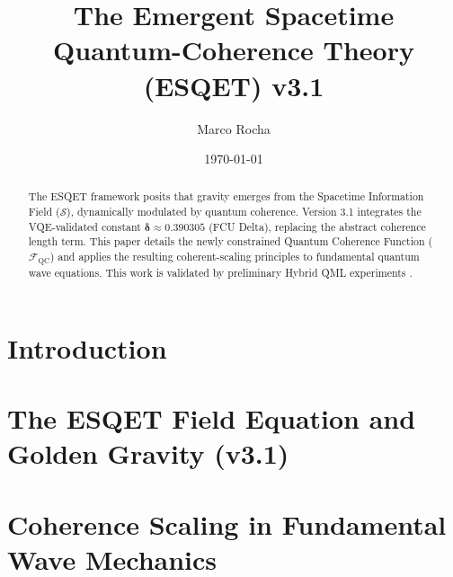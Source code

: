 \documentclass[12pt, a4paper]{report}
\newcommand{\SField}{\mathcal{S}}
\newcommand{\FQC}{\mathcal{F}_{\text{QC}}}
\newcommand{\FCUDelta}{\mathbf{\delta}}
\newcommand{\deltaVal}{0.390305}
\begin{document}
\title{The Emergent Spacetime Quantum-Coherence Theory (ESQET) v3.1}
\author{Marco Rocha}
\date{\today}
\maketitle

\begin{abstract}
The ESQET framework posits that gravity emerges from the Spacetime Information Field ($\SField$), dynamically modulated by quantum coherence. Version 3.1 integrates the VQE-validated constant $\FCUDelta \approx \deltaVal$ (FCU Delta), replacing the abstract coherence length term. This paper details the newly constrained Quantum Coherence Function ($\FQC$) and applies the resulting coherent-scaling principles to fundamental quantum wave equations.
This work is validated by preliminary Hybrid QML experiments \cite{penroseHameroff, rochaESQET}.
\end{abstract}

\clearpage
\tableofcontents

\chapter{Introduction}

\chapter{The ESQET Field Equation and Golden Gravity (v3.1)}

\chapter{Coherence Scaling in Fundamental Wave Mechanics}



\clearpage %
\printbibliography[heading=none] %
\end{document}
